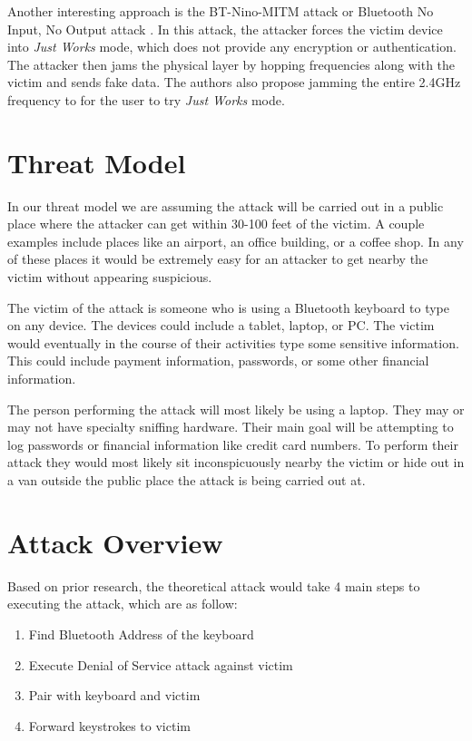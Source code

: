 \documentclass{acm_proc_article-sp}
\begin{document}
Another interesting approach is the BT-Nino-MITM attack or Bluetooth No Input, No Output attack \cite{4401672}
. In this attack, the attacker forces the victim device into \textit{Just Works} mode, which does not provide any encryption or authentication. The attacker then jams the physical layer by hopping frequencies along with the victim and sends fake data. The authors also propose jamming the entire 2.4GHz frequency to for the user to try \textit{Just Works} mode. 

\section{Threat Model}
In our threat model we are assuming the attack will be carried out in a public place where the attacker
can get within 30-100 feet of the victim. A couple examples include places like an airport, an office building, or a coffee shop. In any of these places it would be extremely easy for an attacker to get nearby the victim without appearing suspicious.

The victim of the attack is someone who is using a Bluetooth keyboard to type on any device. The devices could include a tablet, laptop, or PC. The victim would eventually in the course of their activities type some sensitive information. This could include payment information, passwords, or some other financial information. 

The person performing the attack will most likely be using a laptop. They may or may not have specialty sniffing hardware. Their main goal will be attempting to log passwords or financial information like credit card numbers. To perform their attack they would most likely sit inconspicuously nearby the victim or hide out in a van outside the public place the attack is being carried out at.

\section{Attack Overview}
Based on prior research, the theoretical attack would take 4 main steps to executing the attack, which are as follow:
\begin{enumerate}
\item Find Bluetooth Address of the keyboard
\item Execute Denial of Service attack against victim
\item Pair with keyboard and victim
\item Forward keystrokes to victim
\end{enumerate}
\end{document}
